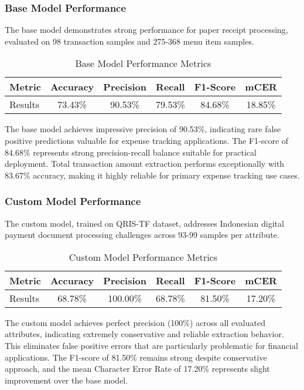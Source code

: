 \subsubsection{Base Model Performance}
The base model demonstrates strong performance for paper receipt processing, evaluated on 98 transaction samples and 275-368 menu item samples.

\begin{table}[htbp]
\centering
\caption{Base Model Performance Metrics}
\label{tab:base-model}
\begin{tabular}{|l|c|c|c|c|c|}
\hline
\textbf{Metric} & \textbf{Accuracy} & \textbf{Precision} & \textbf{Recall} & \textbf{F1-Score} & \textbf{mCER} \\
\hline
Results & 73.43\% & 90.53\% & 79.53\% & 84.68\% & 18.85\% \\
\hline
\end{tabular}
\end{table}

The base model achieves impressive precision of 90.53\%, indicating rare false positive predictions valuable for expense tracking applications. The F1-score of 84.68\% represents strong precision-recall balance suitable for practical deployment. Total transaction amount extraction performs exceptionally with 83.67\% accuracy, making it highly reliable for primary expense tracking use cases.

\subsubsection{Custom Model Performance}
The custom model, trained on QRIS-TF dataset, addresses Indonesian digital payment document processing challenges across 93-99 samples per attribute.

\begin{table}[htbp]
\centering
\caption{Custom Model Performance Metrics}
\label{tab:custom-model}
\begin{tabular}{|l|c|c|c|c|c|}
\hline
\textbf{Metric} & \textbf{Accuracy} & \textbf{Precision} & \textbf{Recall} & \textbf{F1-Score} & \textbf{mCER} \\
\hline
Results & 68.78\% & 100.00\% & 68.78\% & 81.50\% & 17.20\% \\
\hline
\end{tabular}
\end{table}

The custom model achieves perfect precision (100\%) across all evaluated attributes, indicating extremely conservative and reliable extraction behavior. This eliminates false positive errors that are particularly problematic for financial applications. The F1-score of 81.50\% remains strong despite conservative approach, and the mean Character Error Rate of 17.20\% represents slight improvement over the base model.

